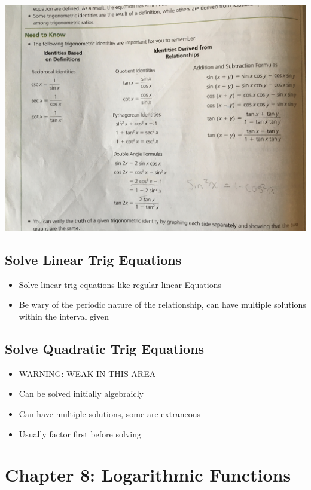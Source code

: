 \documentclass{article}
\begin{document}
    \includegraphics[width=\linewidth]{IMG_0836.JPG}

    \subsection{Solve Linear Trig Equations}
    \begin{itemize}
        \item Solve linear trig equations like regular linear Equations
        \item Be wary of the periodic nature of the relationship, can have multiple solutions within the interval given
    \end{itemize}

    \subsection{Solve Quadratic Trig Equations}
    \begin{itemize}
        \item WARNING: WEAK IN THIS AREA 
        \item Can be solved initially algebraicly
        \item Can have multiple solutions, some are extraneous
        \item Usually factor first before solving
    \end{itemize}

    \section{Chapter 8: Logarithmic Functions}
\end{document}
